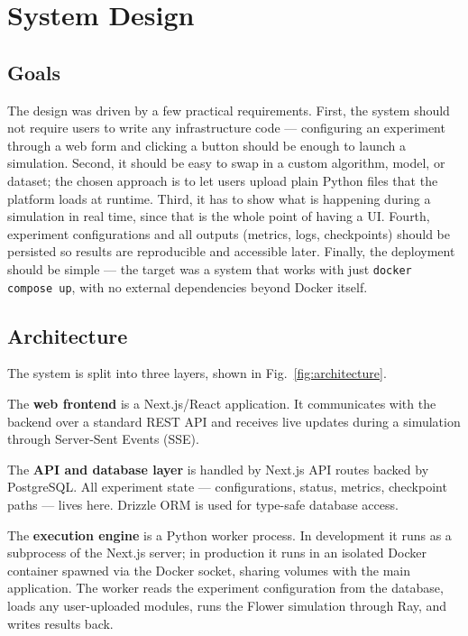 \documentclass[conference]{IEEEtran}
\begin{document}
\section{System Design}
\label{sec:design}

\subsection{Goals}

The design was driven by a few practical requirements.
First, the system should not require users to write any infrastructure
code --- configuring an experiment through a web form and clicking
a button should be enough to launch a simulation.
Second, it should be easy to swap in a custom algorithm, model, or
dataset; the chosen approach is to let users upload plain Python files
that the platform loads at runtime.
Third, it has to show what is happening during a simulation in real time,
since that is the whole point of having a UI.
Fourth, experiment configurations and all outputs (metrics, logs,
checkpoints) should be persisted so results are reproducible and
accessible later.
Finally, the deployment should be simple --- the target was a system
that works with just \texttt{docker compose up}, with no external
dependencies beyond Docker itself.

\subsection{Architecture}

The system is split into three layers, shown in Fig.~\ref{fig:architecture}.

The \textbf{web frontend} is a Next.js/React application.
It communicates with the backend over a standard REST API and receives
live updates during a simulation through Server-Sent Events (SSE).

The \textbf{API and database layer} is handled by Next.js API routes
backed by PostgreSQL.
All experiment state --- configurations, status, metrics, checkpoint
paths --- lives here.
Drizzle ORM is used for type-safe database access.

The \textbf{execution engine} is a Python worker process.
In development it runs as a subprocess of the Next.js server;
in production it runs in an isolated Docker container spawned via the
Docker socket, sharing volumes with the main application.
The worker reads the experiment configuration from the database, loads
any user-uploaded modules, runs the Flower simulation through Ray,
and writes results back.
\end{document}
